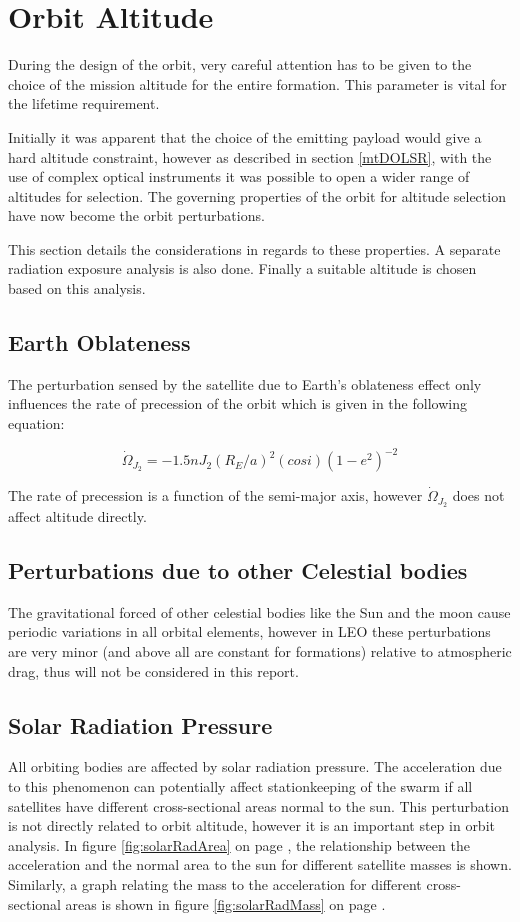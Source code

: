 \section{Orbit Altitude}
\label{mtrOrbAltitude}
During the design of the orbit, very careful attention has to be given to the choice of the mission altitude for the entire formation. This parameter is vital for the lifetime requirement.

Initially it was apparent that the choice of the emitting payload would give a hard altitude constraint, however as described in section \ref{mtDOLSR}, with the use of complex optical instruments it was possible to open a wider range of altitudes for selection. The governing properties of the orbit for altitude selection have now become the orbit perturbations.

This section details the considerations in regards to these properties. A separate radiation exposure analysis is also done. Finally a suitable altitude is chosen based on this analysis.
\subsection{Earth Oblateness}
\label{mtrOrbJ2}
The perturbation sensed by the satellite due to Earth's oblateness effect only influences the rate of precession of the orbit which is given in the following equation:

\begin{equation}
\dot{\Omega} _{J_2} = -1.5nJ_2 ( R_E / a )^2 ( cos i ) ( 1-e^2 )^{-2}
\label{j2eq}
\end{equation}

The rate of precession is a function of the semi-major axis, however $\dot{\Omega}_{J_2}$ does not affect altitude directly.

\subsection{Perturbations due to other Celestial bodies}
\label{mtrOrbSelestialBodies}
The gravitational forced of other celestial bodies like the Sun and the moon  cause periodic variations in all orbital elements, however in \ac{LEO} these perturbations are very minor (and above all are constant for formations) relative to atmospheric drag, thus will not be considered in this report.
\subsection{Solar Radiation Pressure}
\label{mtrOrbSolRadiation}
All orbiting bodies are affected by solar radiation pressure. The acceleration due to this phenomenon can potentially affect stationkeeping of the swarm if all satellites have different cross-sectional areas normal to the sun. This perturbation is not directly related to orbit altitude, however it is an important step in orbit analysis. In figure \ref{fig:solarRadArea} on page \pageref{fig:solarRadArea}, the relationship between the acceleration and the normal area to the sun for different satellite masses is shown. Similarly, a graph relating the mass to the acceleration for different cross-sectional areas is shown in figure \ref{fig:solarRadMass} on page \pageref{fig:solarRadMass}.

